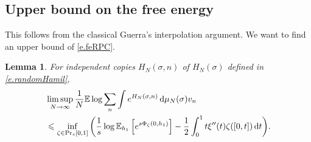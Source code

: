 \documentclass[11pt]{amsart}
\newtheorem{lemma}[proposition]{Lemma}
\theoremstyle{remark}
\theoremstyle{definition}
\numberwithin{equation}{section}
\numberwithin{proposition}{section}
\numberwithin{figure}{section}
\numberwithin{table}{section}
\newcommand{\E}{\mathbb{E}}
\renewcommand{\leq}{\leqslant}
\newcommand{\Ll}{\left}
\newcommand{\Rr}{\right}
\renewcommand{\d}{\mathrm{d}}
\newcommand{\1}{\mathbf{1}}
\begin{document}
\subsection{Upper bound on the free energy}

This follows from the classical Guerra's interpolation argument. We want to find an upper bound of \eqref{e.feRPC}.
\begin{lemma}\label{l.UPBDFE}For independent copies $H_N(\sigma,n)$ of $H_N(\sigma)$ defined in 
\eqref{e.randomHamil},
\begin{align}
&\limsup_{N \to \infty} \frac{1}{N} \E \log \sum_{n}   \int e^{H_N(\sigma,n)} \, \d\mu_N(\sigma) v_n \notag
\\&\leq \inf_{\zeta \in \Pr_s[0,1]}\bigg(   \frac 1 s \log \E_{h_1} \Ll[ e^{s \Phi_\zeta(0,h_1)} \Rr] - \frac{1}{2} \int_0^1 t \xi''(t) \zeta([0,t]) \, \d t \bigg) .\label{e.upperbound_finite}
\end{align}
\end{lemma}
\end{document}
